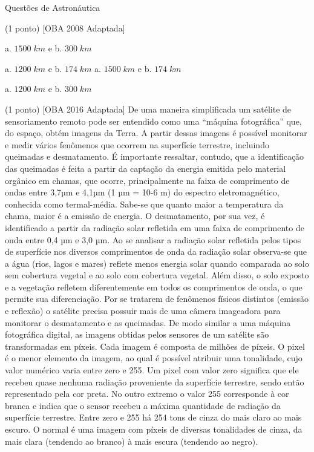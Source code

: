 \documentclass{../lista}
\begin{document}
\begin{secao}{Questões de Astronáutica}
\begin{questao}{(1 ponto) [OBA 2008 Adaptada]}
			\begin{alternativas}
				\item a. $1500 \; km$ e b. $300 \; km$
				\item a. $1200 \; km$ e b. $174 \; km$
				\alternativaMarcada a. $1500 \; km$ e b. $174 \; km$
				\item a. $1200 \; km$ e b. $300 \; km$
			\end{alternativas}
		\end{questao}
		\begin{questao}{(1 ponto) [OBA 2016 Adaptada]}
			De uma maneira simplificada um satélite de sensoriamento remoto pode ser entendido como uma “máquina fotográfica” que, do espaço, obtém imagens da Terra. A partir dessas imagens é possível monitorar e medir vários fenômenos que ocorrem na superfície terrestre, incluindo queimadas e desmatamento. É importante ressaltar, contudo, que a identificação das queimadas é feita a partir da captação da energia emitida pelo material orgânico em chamas, que ocorre, principalmente na faixa de comprimento de ondas entre 3,7µm e 4,1µm (1 µm = 10-6 m) do espectro eletromagnético, conhecida como termal-média. Sabe-se que quanto maior a temperatura da chama, maior é a emissão de energia. O desmatamento, por sua vez, é identificado a partir da radiação solar refletida em uma faixa de comprimento de onda entre 0,4 µm e 3,0 µm. Ao se analisar a radiação solar refletida pelos tipos de superfície nos diversos comprimentos de onda da radiação solar observa-se que a água (rios, lagos e mares) reflete menos energia solar quando comparada ao solo sem cobertura vegetal e ao solo com cobertura vegetal. Além disso, o solo exposto e a vegetação refletem diferentemente em todos os comprimentos de onda, o que permite sua diferenciação. Por se tratarem de fenômenos físicos distintos (emissão e reflexão) o satélite precisa possuir mais de uma câmera imageadora para monitorar o desmatamento e as queimadas. De modo similar a uma máquina fotográfica digital, as imagens obtidas pelos sensores de um satélite são transformadas em píxeis. Cada imagem é composta de milhões de píxeis. O pixel é o menor elemento da imagem, ao qual é possível atribuir uma tonalidade, cujo valor numérico varia entre zero e 255. Um pixel com valor zero significa que ele recebeu quase nenhuma radiação proveniente da superfície terrestre, sendo então representado pela cor preta. No outro extremo o valor 255 corresponde à cor branca e indica que o sensor recebeu a máxima quantidade de radiação da superfície terrestre. Entre zero e 255 há 254 tons de cinza do mais claro ao mais escuro. O normal é uma imagem com píxeis de diversas tonalidades de cinza, da mais clara (tendendo ao branco) à mais escura (tendendo ao negro). \\
			

\end{questao}
\end{secao}
\end{document}
